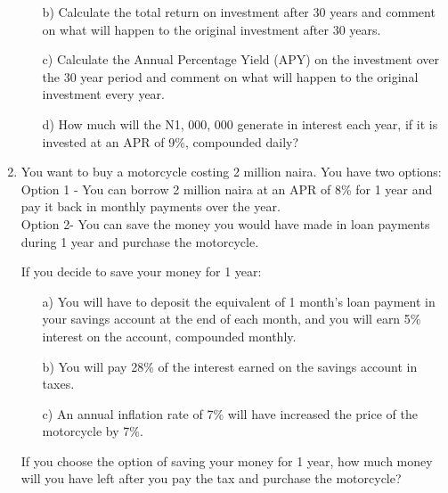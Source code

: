 \documentclass{article}
\begin{document}
\begin{enumerate}
\begin{itemize}
							\item [b)] {Calculate the total return on investment after 30 years and comment on what will happen to the original investment after 30 years.}
							\item [c)] {Calculate the Annual Percentage Yield (APY) on the investment over the 30 year period and comment on what will happen to the original investment every year.}  
							\item [d)] {How much will the N1, 000, 000 generate in interest each year, if it is invested at an APR of 9\%, compounded daily?}
						\end{itemize}
					\item You want to buy a motorcycle costing 2 million naira. You have two options: \\
					Option 1 - You can borrow 2 million naira at an APR of 8\% for 1 year and pay it back in monthly payments over the year.\\
					Option 2- You can save the money you would have made in loan payments during 1 year and purchase the motorcycle.
					
					If you decide to save your money for 1 year:
						\begin{itemize}
							\item [a)] {You will have to deposit the equivalent of 1 month’s loan payment in your savings account at the end of each month, and you will earn 5\% interest on the account, compounded monthly.}
							\item [b)] {You will pay 28\% of the interest earned on the savings account in taxes.} 
							\item [c)] {An annual inflation rate of 7\% will have increased the price of the motorcycle by 7\%.}
					\end{itemize}
					
					If you choose the option of saving your money for 1 year, how much money will you have left after you pay the tax and purchase the motorcycle?
					
					\end{enumerate}
		\cite{ManagingMoney2021}
		
		\newpage
			
		
		
\end{document}
